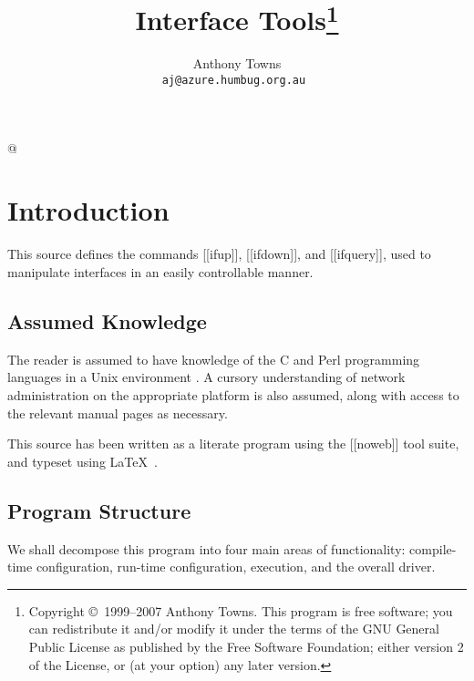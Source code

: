 \documentclass{article}
\begin{document}
@

\def\nwendcode{\endtrivlist\endgroup}
\let\nwdocspar=\relax

\title{ Interface Tools\thanks{
Copyright \copyright\ 1999--2007 Anthony Towns. This program is free
software; you can redistribute it and/or modify it under the terms of
the GNU General Public License as published by the Free Software
Foundation; either version 2 of the License, or (at your option) any
later version.  
}}

\author{ Anthony Towns \\ { \tt aj@azure.humbug.org.au } }


\maketitle
\tableofcontents

\vfill
\pagebreak
{}

\section{Introduction}

This source defines the commands [[ifup]], [[ifdown]], and [[ifquery]], used
to manipulate interfaces in an easily controllable manner.

\subsection{Assumed Knowledge}

The reader is assumed to have knowledge of the C \cite{K&R} and Perl
\cite{camel} programming languages in a Unix environment \cite{StevensUnix}.
A cursory understanding of network administration on the appropriate
platform is also assumed, along with access to the relevant manual
pages as necessary.

This source has been written as a literate program using the [[noweb]]
\cite{wwwnoweb} tool suite, and typeset using \LaTeX\ \cite{latex}.

\subsection{Program Structure}

We shall decompose this program into four main areas of functionality:
compile-time configuration, run-time configuration, execution, and the
overall driver.
\end{document}
